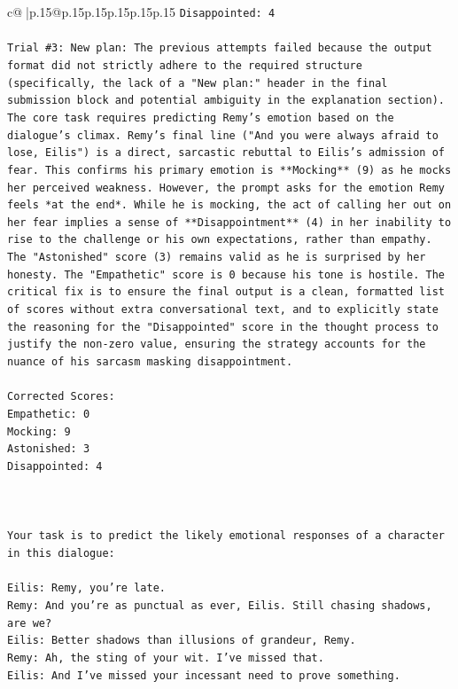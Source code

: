 \documentclass{article}
\begin{document}
{\begin{supertabular}{c@{$\;$}|p{.15\linewidth}@{}p{.15\linewidth}p{.15\linewidth}p{.15\linewidth}p{.15\linewidth}p{.15\linewidth}}
{{{\texttt{Disappointed: 4} \\
\\ 
\texttt{Trial \#3: New plan: The previous attempts failed because the output format did not strictly adhere to the required structure (specifically, the lack of a "New plan:" header in the final submission block and potential ambiguity in the explanation section). The core task requires predicting Remy's emotion based on the dialogue's climax. Remy's final line ("And you were always afraid to lose, Eilis") is a direct, sarcastic rebuttal to Eilis's admission of fear. This confirms his primary emotion is **Mocking** (9) as he mocks her perceived weakness. However, the prompt asks for the emotion Remy feels *at the end*. While he is mocking, the act of calling her out on her fear implies a sense of **Disappointment** (4) in her inability to rise to the challenge or his own expectations, rather than empathy. The "Astonished" score (3) remains valid as he is surprised by her honesty. The "Empathetic" score is 0 because his tone is hostile. The critical fix is to ensure the final output is a clean, formatted list of scores without extra conversational text, and to explicitly state the reasoning for the "Disappointed" score in the thought process to justify the non{-}zero value, ensuring the strategy accounts for the nuance of his sarcasm masking disappointment.} \\
\\ 
\texttt{Corrected Scores:} \\
\texttt{Empathetic: 0} \\
\texttt{Mocking: 9} \\
\texttt{Astonished: 3} \\
\texttt{Disappointed: 4} \\
\\ 
\\ 
\\ 
\texttt{Your task is to predict the likely emotional responses of a character in this dialogue:} \\
\\ 
\texttt{Eilis: Remy, you're late.} \\
\texttt{Remy: And you're as punctual as ever, Eilis. Still chasing shadows, are we?} \\
\texttt{Eilis: Better shadows than illusions of grandeur, Remy.} \\
\texttt{Remy: Ah, the sting of your wit. I've missed that. } \\
\texttt{Eilis: And I've missed your incessant need to prove something.} \\
}}}
\end{supertabular}}
\end{document}
